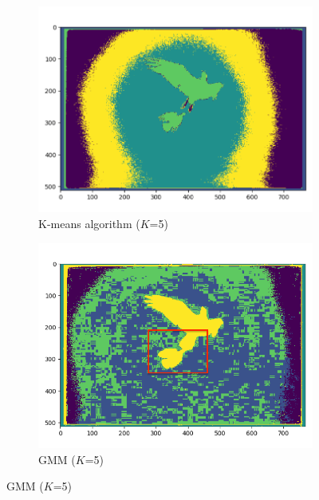 \documentclass[conference]{IEEEtran}
\begin{document}
\begin{figure}
    \begin{subfigure}{.5\linewidth}
        \centering
        \includegraphics[width=1\textwidth]{imgresults/eagle_kmeans.png}
        \caption{K-means algorithm ($K$=5)}
        \label{fig:sub1}
      \end{subfigure}%
      \begin{subfigure}{.5\linewidth}
          \centering
          \includegraphics[width=1\textwidth]{imgresults/eagle_gmm.png}
          \caption{GMM ($K$=5)}
          \label{fig:histogram}
      \end{subfigure}
      \label{fig:sub}



\end{figure}
\end{document}
